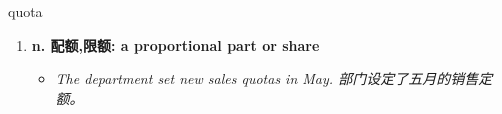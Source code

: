 
\begin{frame}
{\huge quota}
\begin{center}
\begin{enumerate}\Large
  \item \textbf{n. 配额,限额: a proportional part or share}
  \begin{itemize}
    \item \em{\Large{The department set new sales quotas in May. 部门设定了五月的销售定额。}}
  \end{itemize}
\end{enumerate}
\end{center}
\end{frame}
